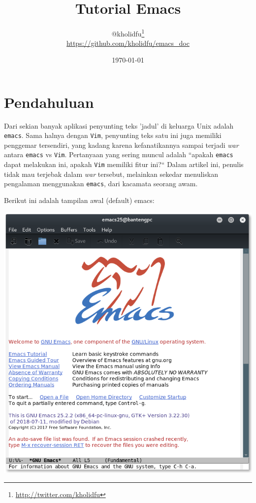 \documentclass{article}
\title{Tutorial Emacs}
\author{
  @kholidfu\footnote{\url{http://twitter.com/kholidfu}}\\
  \footnotesize{\url{https://github.com/kholidfu/emacs\_doc}}
}
\date{\today}
\begin{document}
\maketitle
\tableofcontents
\pagebreak

\section{Pendahuluan}
Dari sekian banyak aplikasi penyunting teks 'jadul' di keluarga
Unix adalah \verb=emacs=. Sama halnya dengan \verb=Vim=, penyunting
teks satu ini juga memiliki penggemar tersendiri, yang kadang
karena kefanatikannya sampai terjadi \emph{war} antara \verb=emacs=
vs \verb=Vim=. Pertanyaan yang sering muncul adalah ``apakah
\verb=emacs= dapat melakukan ini, apakah \verb=Vim= memiliki fitur
ini?`` Dalam artikel ini, penulis tidak mau terjebak dalam 
\emph{war} tersebut, melainkan sekedar menuliskan pengalaman 
menggunakan \verb=emacs=, dari kacamata seorang awam.

Berikut ini adalah tampilan awal (default) emacs:

\vspace{12pt}

\includegraphics[scale=0.45]{images/emacs1.png} 

\vspace{12pt}
\end{document}
